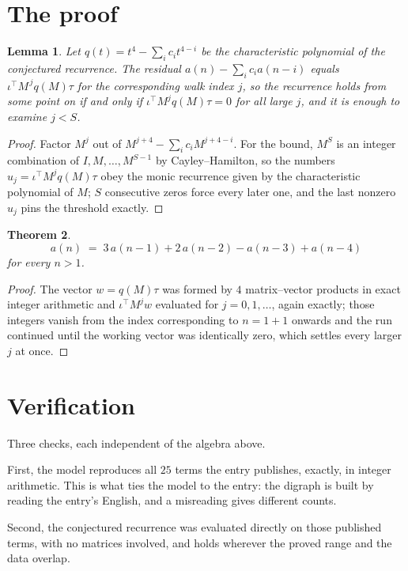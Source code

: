 \documentclass[11pt,a4paper]{article}
\theoremstyle{plain}
\newtheorem{theorem}{Theorem}
\newtheorem{lemma}[theorem]{Lemma}
\theoremstyle{definition}
\begin{document}
\section{The proof}

\begin{lemma}\label{lem:crit}
Let $q(t)=t^{4}-\sum_i c_it^{4-i}$ be the characteristic polynomial of the
conjectured recurrence. The residual $a(n)-\sum_ic_ia(n-i)$ equals
$\iota^{\!\top}M^{\,j}q(M)\tau$ for the corresponding walk index $j$, so the recurrence
holds from some point on if and only if $\iota^{\!\top}M^{j}q(M)\tau=0$ for all large $j$,
and it is enough to examine $j<S$.
\end{lemma}

\begin{proof}
Factor $M^{j}$ out of $M^{j+4}-\sum_ic_iM^{j+4-i}$. For the bound, $M^{S}$
is an integer combination of $I,M,\dots,M^{S-1}$ by Cayley--Hamilton, so the numbers
$u_j=\iota^{\!\top}M^{j}q(M)\tau$ obey the monic recurrence given by the characteristic
polynomial of $M$; $S$ consecutive zeros force every later one, and the last nonzero $u_j$
pins the threshold exactly.
\end{proof}

\begin{theorem}
\[
a(n)\;=\;3\,a(n-1) + 2\,a(n-2) - a(n-3) + a(n-4)
\]
for every $n>1$.
\end{theorem}

\begin{proof}
The vector $w=q(M)\tau$ was formed by $4$ matrix--vector products in exact integer
arithmetic and $\iota^{\!\top}M^{j}w$ evaluated for $j=0,1,\dots$, again exactly; those
integers vanish from the index corresponding to $n=1+1$ onwards and the run continued
until the working vector was identically zero, which settles every larger $j$ at once.
\end{proof}

\section{Verification}

Three checks, each independent of the algebra above.

First, the model reproduces all $25$ terms the entry publishes, exactly, in integer
arithmetic. This is what ties the model to the entry: the digraph is built by reading the
entry's English, and a misreading gives different counts.

Second, the conjectured recurrence was evaluated directly on those published terms, with no
matrices involved, and holds wherever the proved range and the data overlap.
\end{document}
